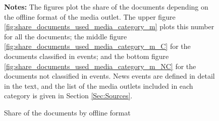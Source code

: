 \begin{figure}
\begin{center}
\end{center}
	\begin{spacing}{0.5}
		{\footnotesize \textbf{Notes:} The figures plot the share of the documents depending on the offline format of the media outlet. The upper figure \ref{fig:share_documents_used_media_category_m} plots this number for all the documents; the middle figure \ref{fig:share_documents_used_media_category_m_C} for the documents classified in events; and the bottom figure \ref{fig:share_documents_used_media_category_m_NC} for the documents not classified in events. News events are defined in detail in the text, and the list of the media outlets included in each category is given in Section \ref{Sec:Sources}.}
	\end{spacing}
\vspace{.5cm}	
	\caption{Share of the documents by offline format}
	\label{fig:share_documents_used_media_category}
\end{figure}



